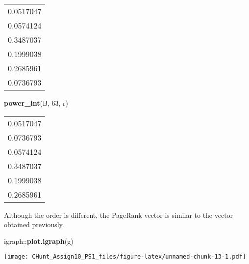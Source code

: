 \documentclass[]{article}
\newenvironment{Shaded}{\begin{snugshade}}{\end{snugshade}}
\newcommand{\KeywordTok}[1]{\textcolor[rgb]{0.13,0.29,0.53}{\textbf{{#1}}}}
\newcommand{\DecValTok}[1]{\textcolor[rgb]{0.00,0.00,0.81}{{#1}}}
\newcommand{\NormalTok}[1]{{#1}}
\begin{document}
\begin{longtable}[]{@{}r@{}}
\toprule
0.0517047\tabularnewline
0.0574124\tabularnewline
0.3487037\tabularnewline
0.1999038\tabularnewline
0.2685961\tabularnewline
0.0736793\tabularnewline
\bottomrule
\end{longtable}

\begin{Shaded}
\begin{Highlighting}[]
\KeywordTok{power_int}\NormalTok{(B, }\DecValTok{63}\NormalTok{, r)}
\end{Highlighting}
\end{Shaded}

\begin{longtable}[]{@{}r@{}}
\toprule
0.0517047\tabularnewline
0.0736793\tabularnewline
0.0574124\tabularnewline
0.3487037\tabularnewline
0.1999038\tabularnewline
0.2685961\tabularnewline
\bottomrule
\end{longtable}

Although the order is different, the PageRank vector is similar to the
vector obtained previously.

\begin{Shaded}
\begin{Highlighting}[]
\NormalTok{igraph::}\KeywordTok{plot.igraph}\NormalTok{(g)}
\end{Highlighting}
\end{Shaded}

\texttt{[image: CHunt\_Assign10\_PS1\_files/figure-latex/unnamed-chunk-13-1.pdf]}
\end{document}
